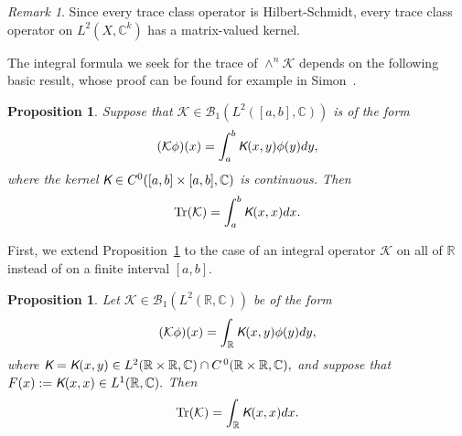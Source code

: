 \documentclass{birkjour}
\newtheorem{prop}[thm]{Proposition}
\theoremstyle{definition}
\theoremstyle{remark}
\newtheorem{rem}[thm]{Remark}
\numberwithin{equation}{section}
\newcommand{\cB}{{\mathcal B}}
\newcommand{\cK}{{\mathcal K}}
\newcommand{\sH}{{\mathsf H}}
\begin{document}
\begin{rem}
Since every trace class operator is Hilbert-Schmidt, every trace class operator
on $L^2(X, \mathbb C^k)$ has a matrix-valued kernel. 
\end{rem}

The integral formula we seek for the trace of  $\wedge^n\cK$ depends on
the following basic result, whose proof can be found for example in Simon~\cite{Simon}.
 
\begin{prop}\label{prop:TraceIntegralFormulaScalarFinite}
Suppose that $\mathcal{K} \in \cB_1(L^2([a,b],\mathbb{C}))$ is of the form
\begin{equation}
    (\mathcal{K}\phi)(x) = \int_a^b \emph{\textsf K}(x,y) \phi(y) dy,
\end{equation}
where the kernel $\emph{\textsf K}\in C^0([a,b]\times[a,b], \mathbb C)$ is continuous. Then \begin{equation}
    \operatorname{Tr}(\mathcal{K}) = \int_a^b \emph{\textsf K}(x,x)dx.
\end{equation}
\end{prop}
 
First, we extend Proposition~\ref{prop:TraceIntegralFormulaScalarFinite} to the case of an integral operator 
$\mathcal{K}$  on all of $\mathbb{R}$ instead of on a finite interval  $[a,b]$.


\begin{prop}\label{prop:TraceIntegralFormulaScalarReal}
Let $\mathcal{K} \in \cB_1(L^2(\mathbb{R},\mathbb{C}))$ be of the form
\begin{equation}
    (\mathcal{K}\phi)(x) = \int_{\mathbb{R}} \emph{\textsf K}(x,y) \phi(y) dy,
\end{equation}
where $\emph{\textsf K} = \emph{\textsf K}(x,y) \in L^2(\mathbb{R} \times \mathbb{R}, \mathbb{C}) \cap C^{\,0}(\mathbb{R} \times \mathbb{R},\mathbb{C}),$ and suppose that $F(x) := \emph{\textsf K}(x,x) \in L^1(\mathbb{R},\mathbb{C}).$ Then
\begin{equation}
    \operatorname{Tr}(\mathcal{K}) = \int_{\mathbb{R}} \emph{\textsf K}(x,x) dx.
\end{equation}
\end{prop}
\end{document}

